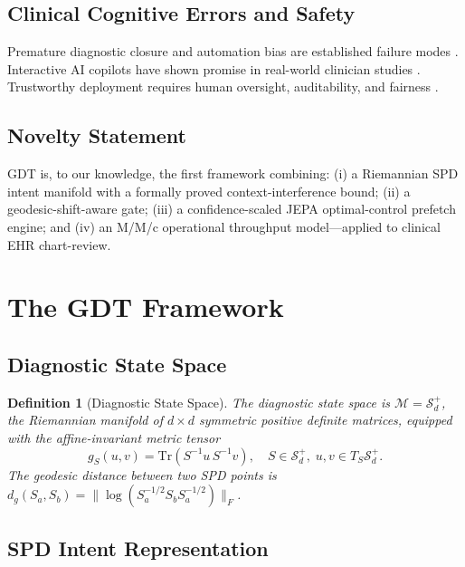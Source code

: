 \documentclass[journal,10pt,twoside]{IEEEtran}
\newtheorem{definition}{Definition}
\begin{document}
\subsection{Clinical Cognitive Errors and Safety}
Premature diagnostic closure and automation bias are established failure modes \cite{croskerry2003,goddard2012}. Interactive AI copilots have shown promise in real-world clinician studies \cite{zhu2026_aicare}. Trustworthy deployment requires human oversight, auditability, and fairness \cite{lekadir25}.

\subsection{Novelty Statement}
GDT is, to our knowledge, the first framework combining: (i) a Riemannian SPD intent manifold with a formally proved context-interference bound; (ii) a geodesic-shift-aware gate; (iii) a confidence-scaled JEPA optimal-control prefetch engine; and (iv) an M/M/c operational throughput model---applied to clinical EHR chart-review.

\section{The GDT Framework}
\label{sec:framework}

\subsection{Diagnostic State Space}

\begin{definition}[Diagnostic State Space]
\label{def:state_space}
The \emph{diagnostic state space} is $\mathcal{M} = \mathcal{S}_d^+$, the Riemannian manifold of $d{\times}d$ symmetric positive definite matrices, equipped with the affine-invariant metric tensor
\begin{equation}
  g_S(u, v) = \mathrm{Tr}(S^{-1} u\, S^{-1} v),
  \quad S \in \mathcal{S}_d^+,\; u,v \in T_S\mathcal{S}_d^+.
  \label{eq:metric_tensor}
\end{equation}
The geodesic distance between two SPD points is
$d_g(S_a, S_b) = \|\log(S_a^{-1/2} S_b S_a^{-1/2})\|_F$.
\end{definition}

\subsection{SPD Intent Representation}
\end{document}
